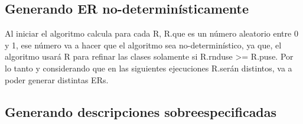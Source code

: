 \subsection{Generando ER no-determin\'isticamente}

Al iniciar el algoritmo calcula para cada R, R.\randomuse que es un n\'umero aleatorio entre 0 y 1, ese n\'umero va a hacer que el algoritmo sea no-determin\'istico, ya que, el algoritmo usar\'a R para refinar las clases solamente si 
R.rnduse >= R.puse. Por lo tanto y considerando que en las siguientes ejecuciones R.\randomuse ser\'an distintos, va a poder generar distintas ERs.

\subsection{Generando descripciones sobreespecificadas}\label{sec:overspecification}

